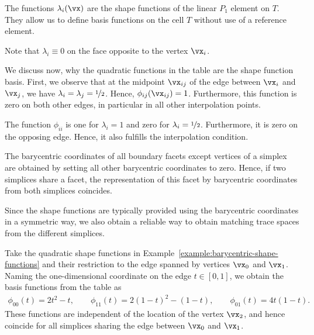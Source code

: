 \begin{example}
  The functions $\lambda_i(\vx)$ are the shape functions of the linear
  $P_1$ element on $T$. They allow us to define basis functions on the
  cell $T$ without use of a reference element.

  Note that $\lambda_i\equiv 0$ on the face opposite to the
  vertex $\vx_i$.
  
  We discuss now, why the quadratic functions in the table are the
  shape function basis. First, we observe that at the midpoint
  $\vx_{ij}$ of the edge between $\vx_i$ and $\vx_j$, we have
  $\lambda_i = \lambda_j = \nicefrac12$. Hence,
  $\phi_{ij}(\vx_{ij}) = 1$. Furthermore, this function is zero on
  both other edges, in particular in all other interpolation points.

  The function $\phi_{ii}$ is one for $\lambda_i = 1$ and zero for
  $\lambda_i=\nicefrac12$. Furthermore, it is zero on the opposing
  edge. Hence, it also fulfills the interpolation condition.
\end{example}

\begin{remark}
  The barycentric coordinates of all boundary facets except vertices
  of a simplex are obtained by setting all other barycentric
  coordinates to zero. Hence, if two simplices share a facet, the
  representation of this facet by barycentric coordinates from both
  simplices coincides.

  Since the shape functions are typically provided using the
  barycentric coordinates in a symmetric way, we also obtain a
  reliable way to obtain matching trace spaces from the different
  simplices.
\end{remark}

\begin{example}
  Take the quadratic shape functions in
  Example~\ref{example:barycentric-shape-functions} and their
  restriction to the edge spanned by vertices $\vx_0$ and
  $\vx_1$. Naming the one-dimensional coordinate on the edge
  $t\in[0,1]$, we obtain the basis functions from the table as
  \begin{gather}
    \phi_{00}(t) = 2t^2-t,\qquad
    \phi_{11}(t) = 2(1-t)^2 - (1-t),
    \qquad
    \phi_{01}(t) = 4t(1-t).
  \end{gather}
  These functions are independent of the location of the vertex
  $\vx_2$, and hence coincide for all simplices sharing the edge
  between $\vx_0$ and $\vx_1$.
\end{example}

